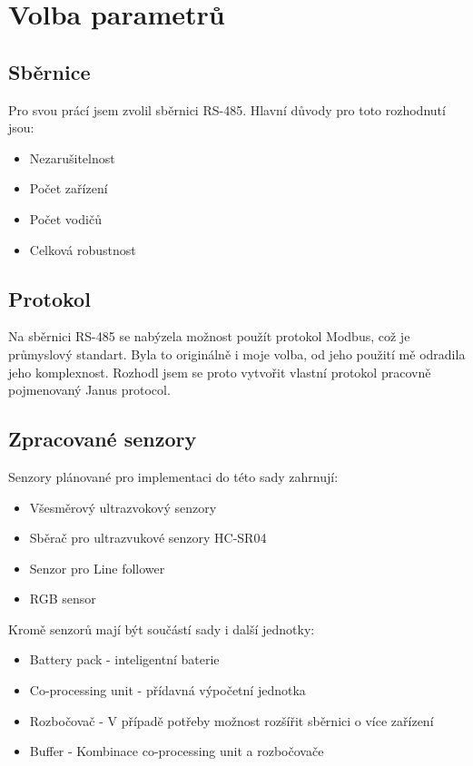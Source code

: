 \chapter{Volba parametrů}
\section{Sběrnice}
Pro svou prácí jsem zvolil sběrnici RS-485.
Hlavní důvody pro toto rozhodnutí jsou:
\begin{itemize}
    \item Nezarušitelnost
    \item Počet zařízení
    \item Počet vodičů
    \item Celková robustnost
\end{itemize}

\section{Protokol}
Na sběrnici RS-485 se nabýzela možnost použít protokol Modbus, což je průmyslový standart.
Byla to originálně i moje volba, od jeho použití mě odradila jeho komplexnost.
Rozhodl jsem se proto vytvořit vlastní protokol pracovně pojmenovaný Janus protocol.

\section{Zpracované senzory}
Senzory plánované pro implementaci do této sady zahrnují:
\begin{itemize}
    \item Všesměrový ultrazvokový senzory
    \item Sběrač pro ultrazvukové senzory HC-SR04
    \item Senzor pro Line follower
    \item RGB sensor
    
\end{itemize}
Kromě senzorů mají být součástí sady i další jednotky:
\begin{itemize}
    \item Battery pack - inteligentní baterie
    \item Co-processing unit - přídavná výpočetní jednotka
    \item Rozbočovač - V případě potřeby možnost rozšířit sběrnici o více zařízení
    \item Buffer - Kombinace co-processing unit a rozbočovače
\end{itemize}
